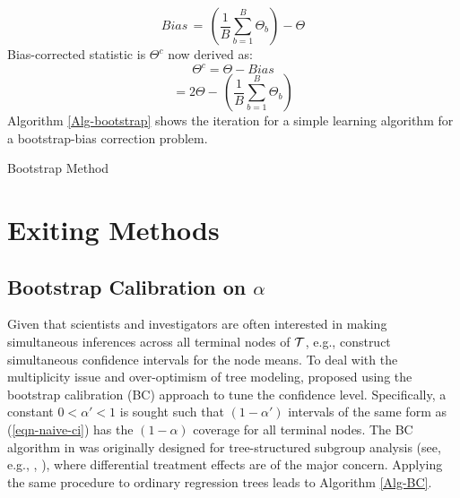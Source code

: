 \begin{equation}
\label{eqn-bias 1}
Bias\,=\, (\frac{1}{B} \sum_{b=1}^{B}\Theta_{b}) - \Theta
\end{equation}
Bias-corrected statistic is $\Theta^{c}$ now derived  as:
$$\Theta^{c} = \Theta - Bias$$ 
$$  = 2\Theta - \, (\frac{1}{B} \sum_{b=1}^{B}\Theta_{b}) $$
Algorithm \ref{Alg-bootstrap} shows the iteration for a simple learning algorithm for a bootstrap-bias correction problem.

\vspace{.2in}
\IncMargin{1em}
\begin{algorithm}[H]
	\caption{Bootstrap Method} \label{Alg-bootstrap}
	
\end{algorithm}
\vspace{.2in}


\section{Exiting Methods}
\subsection{Bootstrap Calibration on  $\alpha$}
Given that scientists and investigators are often interested in making simultaneous inferences across all terminal nodes of $\mathcal{T}$, e.g., construct simultaneous confidence intervals for the node means. To deal with the multiplicity issue and over-optimism of tree modeling, \cite{loh2018subgroups} proposed using the bootstrap calibration (BC) approach \citep{loh1987calibrating, loh1991bootstrap} to tune the confidence level. Specifically, a constant $0 < \alpha' <1 $ is sought such that $(1-\alpha')$ intervals of the same form as (\ref{eqn-naive-ci}) has the $(1-\alpha)$ coverage for all terminal nodes. 
The BC algorithm in \cite{loh2018subgroups} was originally designed for tree-structured subgroup analysis (see, e.g., \citeauthor{su2009subgroup}, \citeyear{su2009subgroup}), where differential treatment effects are of the major concern. Applying the same procedure to ordinary regression trees leads to Algorithm \ref{Alg-BC}.

